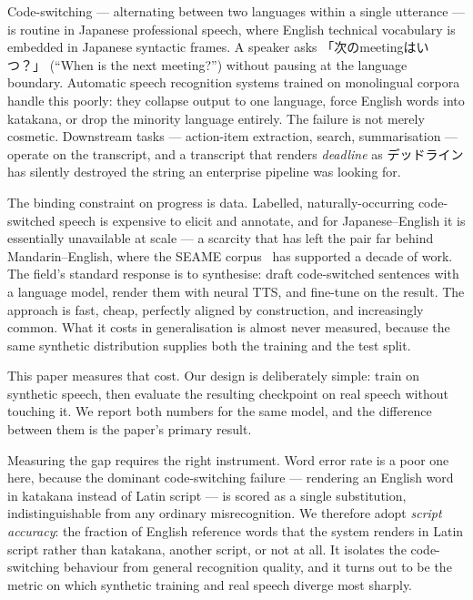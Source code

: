 \documentclass[11pt,a4paper]{article}
\begin{document}
Code-switching --- alternating between two languages within a single utterance
--- is routine in Japanese professional speech, where English technical
vocabulary is embedded in Japanese syntactic frames. A speaker asks
\mbox{「次のmeetingはいつ？」} (``When is the next meeting?'') without pausing at
the language boundary. Automatic speech recognition systems trained on
monolingual corpora handle this poorly: they collapse output to one language,
force English words into katakana, or drop the minority language entirely. The
failure is not merely cosmetic. Downstream tasks --- action-item extraction,
search, summarisation --- operate on the transcript, and a transcript that renders
\emph{deadline} as \mbox{デッドライン} has silently destroyed the string an
enterprise pipeline was looking for.

The binding constraint on progress is data. Labelled, naturally-occurring
code-switched speech is expensive to elicit and annotate, and for Japanese--English
it is essentially unavailable at scale --- a scarcity that has left the pair far
behind Mandarin--English, where the SEAME corpus~\cite{lyu2010seame} has supported
a decade of work. The field's standard response is to synthesise: draft
code-switched sentences with a language model, render them with neural TTS, and
fine-tune on the result. The approach is fast, cheap, perfectly aligned by
construction, and increasingly common. What it costs in generalisation is
almost never measured, because the same synthetic distribution supplies both the
training and the test split.

This paper measures that cost. Our design is deliberately simple: train on
synthetic speech, then evaluate the resulting checkpoint on real speech without
touching it. We report both numbers for the same model, and the difference
between them is the paper's primary result.

Measuring the gap requires the right instrument. Word error rate is a poor one
here, because the dominant code-switching failure --- rendering an English word
in katakana instead of Latin script --- is scored as a single substitution,
indistinguishable from any ordinary misrecognition. We therefore adopt
\emph{script accuracy}: the fraction of English reference words that the system
renders in Latin script rather than katakana, another script, or not at all. It
isolates the code-switching behaviour from general recognition quality, and it
turns out to be the metric on which synthetic training and real speech diverge
most sharply.
\end{document}
